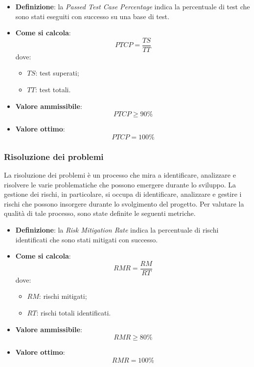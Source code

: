 \hypertarget{30M}{}
\begin{itemize}
	\item \textbf{Definizione}: la \textit{Passed Test Case Percentage} indica la percentuale di test che sono stati eseguiti con successo su una base di test.
	\item \textbf{Come si calcola}: \begin{equation*}PTCP = \frac{TS}{TT}\end{equation*} dove:
		\begin{itemize}
			\item $TS$: test superati;
			\item $TT$: test totali.
		\end{itemize}
	\item \textbf{Valore ammissibile}: \begin{equation*}PTCP \geq 90\%\end{equation*}
	\item \textbf{Valore ottimo}: \begin{equation*}PTCP = 100\%\end{equation*}
\end{itemize}



\subsubsection{Risoluzione dei problemi}
La risoluzione dei problemi è un processo che mira a identificare, analizzare e risolvere le varie problematiche che possono emergere durante lo sviluppo. La gestione dei rischi, in particolare, si occupa di identificare, analizzare e gestire i rischi che possono insorgere durante lo svolgimento del progetto. Per valutare la qualità di tale processo, sono state definite le seguenti metriche.

\hypertarget{31M}{}
\begin{itemize}
	\item \textbf{Definizione}: la \textit{Risk Mitigation Rate} indica la percentuale di rischi identificati che sono stati mitigati con successo.
	\item \textbf{Come si calcola}: \begin{equation*}RMR = \frac{RM}{RT}\end{equation*} dove:
		\begin{itemize}
			\item $RM$: rischi mitigati;
			\item $RT$: rischi totali identificati.
		\end{itemize}
	\item \textbf{Valore ammissibile}: \begin{equation*}RMR \geq 80\%\end{equation*}
	\item \textbf{Valore ottimo}: \begin{equation*}RMR = 100\%\end{equation*}
\end{itemize}

